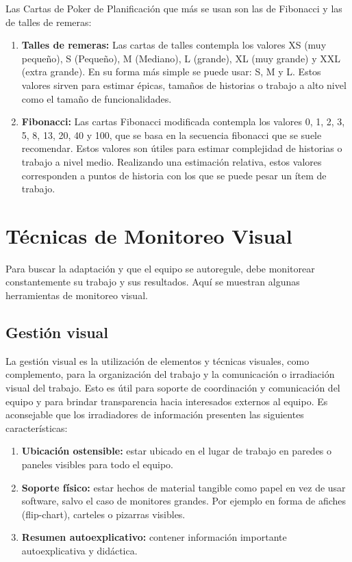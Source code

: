 Las Cartas de Poker de Planificación que más se usan son las de Fibonacci y las de talles de remeras:

\begin{enumerate}

\item \textbf{Talles de remeras:} Las cartas de talles contempla los valores XS (muy pequeño), S (Pequeño), M (Mediano), L (grande), XL (muy grande) y XXL (extra grande). En su forma más simple se puede usar: S, M y L. Estos valores sirven para estimar épicas, tamaños de historias o trabajo a alto nivel como el tamaño de funcionalidades. 

\item \textbf{Fibonacci:} Las cartas Fibonacci modificada contempla los valores 0, 1, 2, 3, 5, 8, 13, 20, 40 y 100, que se basa en la secuencia fibonacci que se suele recomendar. Estos valores son útiles para estimar complejidad de historias o trabajo a nivel medio. Realizando una estimación relativa, estos valores corresponden a puntos de historia con los que se puede pesar un ítem de trabajo.

\end{enumerate}

\newpage
\section{Técnicas de Monitoreo Visual}

Para buscar la adaptación y que el equipo se autoregule, debe monitorear constantemente su trabajo y sus resultados. Aquí se muestran algunas herramientas de monitoreo visual.

\subsection{Gestión visual}

La gestión visual es la utilización de elementos y técnicas visuales, como complemento, para la organización del trabajo y la comunicación o irradiación visual del trabajo. Esto es útil para soporte de coordinación y comunicación del equipo y para brindar transparencia hacia interesados externos al equipo.
Es aconsejable que los irradiadores de información presenten las siguientes características:

\begin{enumerate}

\item \textbf{Ubicación ostensible:} estar ubicado en el lugar de trabajo en paredes o paneles visibles para todo el equipo.

\item \textbf{Soporte físico:} estar hechos de material tangible como papel en vez de usar software, salvo el caso de monitores grandes. Por ejemplo en forma de afiches (flip-chart), carteles o pizarras visibles.

\item \textbf{Resumen autoexplicativo:} contener información importante autoexplicativa y didáctica.

\end{enumerate}

